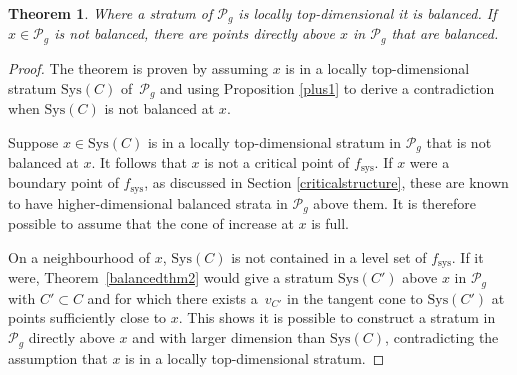 \documentclass[pdftex]{sigma}
\numberwithin{equation}{section}
\newtheorem{Theorem}{Theorem}[section]
\begin{document}
\begin{Theorem}
\label{balancedthm}
Where a stratum of $\mathcal{P}_{g}$ is locally top-dimensional it is balanced. If $x\in \mathcal{P}_{g}$ is not balanced, there are points directly above $x$ in $\mathcal{P}_{g}$ that are balanced.
\end{Theorem}

\begin{proof}
The theorem is proven by assuming $x$ is in a locally top-dimensional stratum $\mathrm{Sys}(C)$ of~$\mathcal{P}_{g}$ and using Proposition \ref{plus1} to derive a contradiction when $\mathrm{Sys}(C)$ is not balanced at $x$.

Suppose $x\in \mathrm{Sys}(C)$ is in a locally top-dimensional stratum in $\mathcal{P}_{g}$ that is not balanced at $x$. It follows that $x$ is not a critical point of $f_{\mathrm{sys}}$. If $x$ were a boundary point of $f_{\mathrm{sys}}$, as discussed in Section \ref{criticalstructure}, these are known to have higher-dimensional balanced strata in $\mathcal{P}_{g}$ above them. It is therefore possible to assume that the cone of increase at $x$ is full.

On a neighbourhood of $x$, $\mathrm{Sys}(C)$ is not contained in a level set of $f_{\mathrm{sys}}$. If it were, Theorem~\ref{balancedthm2} would give a stratum $\mathrm{Sys}(C')$ above $x$ in $\mathcal{P}_{g}$ with $C'\subset C$ and for which there exists a~$v_{C'}$ in the tangent cone to $\mathrm{Sys}(C')$ at points sufficiently close to $x$. This shows it is possible to construct a stratum in $\mathcal{P}_{g}$ directly above $x$ and with larger dimension than $\mathrm{Sys}(C)$, contradicting the assumption that $x$ is in a locally top-dimensional stratum.


\end{proof}
\end{document}
